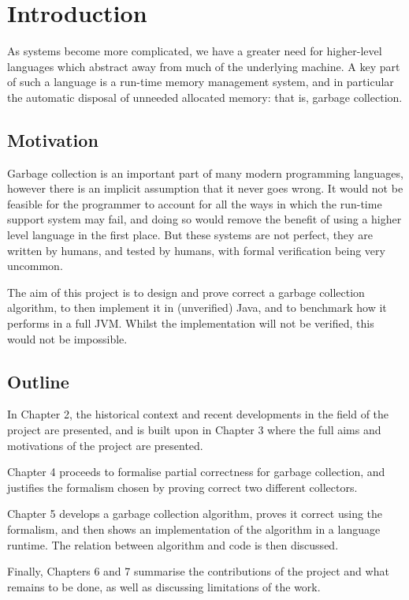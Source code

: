 \chapter{Introduction}

As systems become more complicated, we have a greater need for
higher-level languages which abstract away from much of the underlying
machine. A key part of such a language is a run-time memory management
system, and in particular the automatic disposal of unneeded allocated
memory: that is, garbage collection.

\section{Motivation}

Garbage collection is an important part of many modern programming
languages, however there is an implicit assumption that it never goes
wrong. It would not be feasible for the programmer to account for all
the ways in which the run-time support system may fail, and doing so
would remove the benefit of using a higher level language in the first
place. But these systems are not perfect, they are written by humans,
and tested by humans, with formal verification being very uncommon.

The aim of this project is to design and prove correct a garbage
collection algorithm, to then implement it in (unverified) Java, and
to benchmark how it performs in a full JVM. Whilst the implementation
will not be verified, this would not be impossible.

\section{Outline}

In Chapter 2, the historical context and recent developments in the
field of the project are presented, and is built upon in Chapter 3
where the full aims and motivations of the project are
presented.

Chapter 4 proceeds to formalise partial correctness for
garbage collection, and justifies the formalism chosen by proving
correct two different collectors.

Chapter 5 develops a garbage collection algorithm, proves it
correct using the formalism, and then shows an implementation of the
algorithm in a language runtime. The relation between algorithm and
code is then discussed.

Finally, Chapters 6 and 7 summarise the contributions of the project
and what remains to be done, as well as discussing limitations of the
work.
